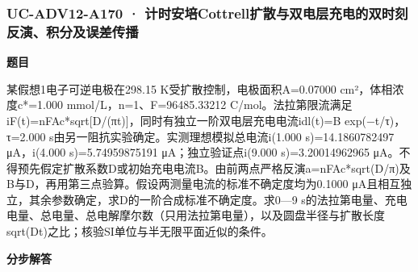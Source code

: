\documentclass[UTF8,11pt,a4paper]{ctexart}
\begin{document}
\subsubsection*{UC-ADV12-A170 · 计时安培Cottrell扩散与双电层充电的双时刻反演、积分及误差传播}
\noindent\textbf{题目}\par
某假想1电子可逆电极在298.15 K受扩散控制，电极面积A=0.07000 cm²，体相浓度c*=1.000 mmol/L，n=1、F=96485.33212 C/mol。法拉第限流满足iF(t)=nFAc*sqrt[D/(πt)]，同时有独立一阶双电层充电电流idl(t)=B exp(−t/τ)，τ=2.000 s由另一阻抗实验确定。实测理想模拟总电流i(1.000 s)=14.1860782497 μA，i(4.000 s)=5.74959875191 μA；独立验证点i(9.000 s)=3.20014962965 μA。不得预先假定扩散系数D或初始充电电流B。由前两点严格反演a=nFAc*sqrt(D/π)及B与D，再用第三点验算。假设两测量电流的标准不确定度均为0.1000 μA且相互独立，其余参数确定，求D的一阶合成标准不确定度。求0—9 s的法拉第电量、充电电量、总电量、总电解摩尔数（只用法拉第电量），以及圆盘半径与扩散长度sqrt(Dt)之比；核验SI单位与半无限平面近似的条件。\par
\medskip\noindent\textbf{分步解答}
\end{document}
